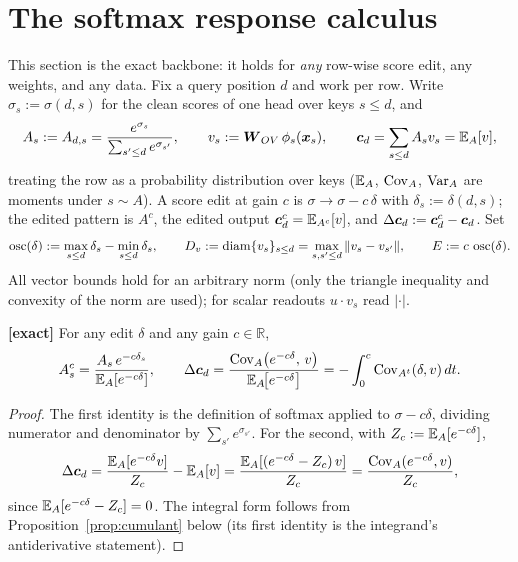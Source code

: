 \documentclass{article}
\begin{document}
\section{The softmax response calculus}\label{sec:calculus}

This section is the exact backbone: it holds for \emph{any} row-wise score edit, any weights, and any data. Fix a query position $d$ and work per row. Write $\sigma_s := \sigma(d,s)$ for the clean scores of one head over keys $s \le d$, and
\begin{equation}
    A_s := A_{d,s} = \frac{e^{\sigma_s}}{\sum_{s'\le d} e^{\sigma_{s'}}}, \qquad
    v_s := \boldsymbol{W}_{OV}\,\phi_s(\boldsymbol{x}_s), \qquad
    \boldsymbol{c}_d = \sum_{s\le d} A_s v_s = \mathbb{E}_A[v],
\end{equation}
treating the row as a probability distribution over keys ($\mathbb{E}_A$, $\operatorname{Cov}_A$, $\operatorname{Var}_A$ are moments under $s \sim A$). A score edit at gain $c$ is $\sigma \to \sigma - c\,\delta$ with $\delta_s := \delta(d,s)$; the edited pattern is $A^c$, the edited output $\boldsymbol{c}_d^c = \mathbb{E}_{A^c}[v]$, and $\Delta\boldsymbol{c}_d := \boldsymbol{c}_d^c - \boldsymbol{c}_d$. Set
\begin{equation}
    \operatorname{osc}(\delta) := \max_{s\le d}\delta_s - \min_{s\le d}\delta_s, \qquad
    D_v := \operatorname{diam}\{v_s\}_{s\le d} = \max_{s,s'\le d}\|v_s - v_{s'}\|, \qquad
    E := c\,\operatorname{osc}(\delta).
\end{equation}
All vector bounds hold for an arbitrary norm (only the triangle inequality and convexity of the norm are used); for scalar readouts $u\cdot v_s$ read $|\cdot|$.

\begin{prop}\label{prop:tilt}
\textbf{[exact]} For any edit $\delta$ and any gain $c \in \mathbb{R}$,
\begin{equation}\label{eq:tilt}
    A^{c}_s = \frac{A_s\, e^{-c\delta_s}}{\mathbb{E}_A[e^{-c\delta}]},
    \qquad
    \Delta\boldsymbol{c}_d = \frac{\operatorname{Cov}_A\!\big(e^{-c\delta},\, v\big)}{\mathbb{E}_A\!\big[e^{-c\delta}\big]}
    = -\int_0^c \operatorname{Cov}_{A^t}(\delta, v)\, dt .
\end{equation}
\end{prop}
\begin{proof}
The first identity is the definition of softmax applied to $\sigma - c\delta$, dividing numerator and denominator by $\sum_{s'} e^{\sigma_{s'}}$. For the second, with $Z_c := \mathbb{E}_A[e^{-c\delta}]$,
\begin{equation}
    \Delta\boldsymbol{c}_d = \frac{\mathbb{E}_A[e^{-c\delta}v]}{Z_c} - \mathbb{E}_A[v]
    = \frac{\mathbb{E}_A[(e^{-c\delta} - Z_c)\,v]}{Z_c}
    = \frac{\operatorname{Cov}_A(e^{-c\delta}, v)}{Z_c},
\end{equation}
since $\mathbb{E}_A[e^{-c\delta} - Z_c] = 0$. The integral form follows from Proposition~\ref{prop:cumulant} below (its first identity is the integrand's antiderivative statement).
\end{proof}
\end{document}

